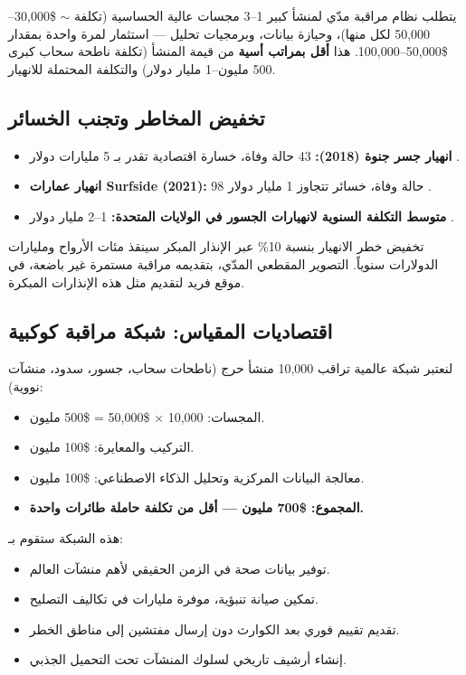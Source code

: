 \documentclass[12pt,a4paper]{article}
\theoremstyle{remark}
\begin{document}
	يتطلب نظام مراقبة مدّي لمنشأ كبير 1–3 مجسات عالية الحساسية (تكلفة \(\sim\) \$30,000–50,000 لكل منها)، وحيازة بيانات، وبرمجيات تحليل — استثمار لمرة واحدة بمقدار \$50,000–100,000. هذا \textbf{أقل بمراتب أسية} من قيمة المنشأ (تكلفة ناطحة سحاب كبرى 500 مليون–1 مليار دولار) والتكلفة المحتملة للانهيار.
	
	\subsection{تخفيض المخاطر وتجنب الخسائر}
	
	\begin{itemize}
		\item \textbf{انهيار جسر جنوة (2018):} 43 حالة وفاة، خسارة اقتصادية تقدر بـ 5 مليارات دولار \cite{Genoa2018}.
		\item \textbf{انهيار عمارات Surfside (2021):} 98 حالة وفاة، خسائر تتجاوز 1 مليار دولار \cite{Surfside2021}.
		\item \textbf{متوسط التكلفة السنوية لانهيارات الجسور في الولايات المتحدة:} 1–2 مليار دولار \cite{ASCE2021}.
	\end{itemize}
	
	تخفيض خطر الانهيار بنسبة 10\% عبر الإنذار المبكر سينقذ مئات الأرواح ومليارات الدولارات سنوياً. التصوير المقطعي المدّي، بتقديمه مراقبة مستمرة غير باضعة، في موقع فريد لتقديم مثل هذه الإنذارات المبكرة.
	
	\subsection{اقتصاديات المقياس: شبكة مراقبة كوكبية}
	
	لنعتبر شبكة عالمية تراقب 10,000 منشأ حرج (ناطحات سحاب، جسور، سدود، منشآت نووية):
	
	\begin{itemize}
		\item المجسات: 10,000 × \$50,000 = \$500 مليون.
		\item التركيب والمعايرة: \$100 مليون.
		\item معالجة البيانات المركزية وتحليل الذكاء الاصطناعي: \$100 مليون.
		\item \textbf{المجموع: \$700 مليون — أقل من تكلفة حاملة طائرات واحدة.}
	\end{itemize}
	
	هذه الشبكة ستقوم بـ:
	\begin{itemize}
		\item توفير بيانات صحة في الزمن الحقيقي لأهم منشآت العالم.
		\item تمكين صيانة تنبؤية، موفرة مليارات في تكاليف التصليح.
		\item تقديم تقييم فوري بعد الكوارث دون إرسال مفتشين إلى مناطق الخطر.
		\item إنشاء أرشيف تاريخي لسلوك المنشآت تحت التحميل الجذبي.
	\end{itemize}
	
\end{document}
